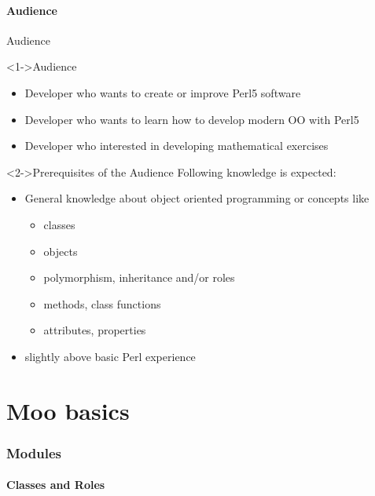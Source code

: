 \documentclass[ngerman,xcolor={table,dvipsnames},smaller,compress,hyperref={bookmarks,colorlinks}]{beamer}
\begin{document}
\subsection{Audience}

\begin{frame}[t,fragile]{Audience}
\begin{block}<1->{Audience}
\begin{itemize}
\item Developer who wants to create or improve Perl5 software
\item Developer who wants to learn how to develop modern OO with Perl5
\item Developer who interested in developing mathematical exercises
\end{itemize}
\end{block}

\begin{block}<2->{Prerequisites of the Audience}
Following knowledge is expected:
\begin{itemize}
\item General knowledge about object oriented programming or concepts like
    \small
    \begin{itemize}
    \item classes
    \item objects
    \item polymorphism, inheritance and/or roles
    \item methods, class functions
    \item attributes, properties
    \end{itemize}
    \normalsize
\item slightly above basic Perl experience
\end{itemize}
\end{block}
\end{frame}

\part{Moo basics}

\section{Modules}

\subsection{Classes and Roles}
\end{document}
